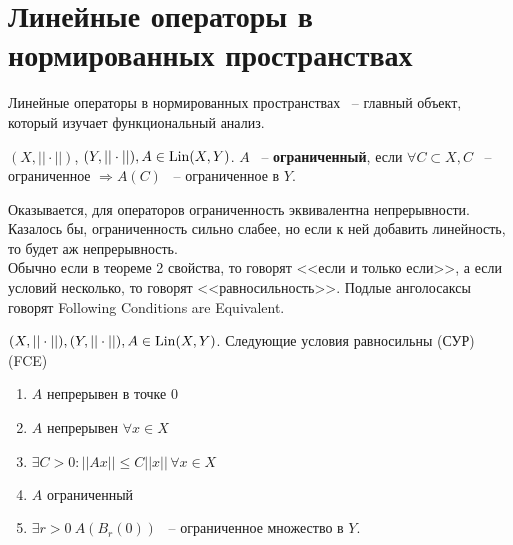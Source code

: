 \documentclass[document]{subfiles}
\begin{document}
\section{Линейные операторы в нормированных пространствах}
Линейные операторы в нормированных пространствах ~-- главный объект, который изучает функциональный анализ.
\begin{definition}
    $(X, || \cdot||)$, $(Y, || \cdot ||), A \in \operatorname{Lin}(X,Y) $. $A$ ~-- \textbf{ ограниченный}, если $\forall C \subset X, C$ ~-- ограниченное $\Rightarrow A(C)$ ~-- ограниченное 
    в $Y$.
\end{definition}
Оказывается, для операторов ограниченность эквивалентна непрерывности. Казалось бы, ограниченность сильно слабее, но если к ней добавить  линейность, то будет аж непрерывность. \\
Обычно если в теореме 2 свойства, то говорят <<если и только если>>, а если условий несколько, то говорят <<равносильность>>. Подлые анголосаксы говорят Following Conditions are Equivalent.

\begin{theorem}
    $(X, ||\cdot||), (Y, ||\cdot||), A \in \operatorname{Lin}(X,Y)$. Следующие условия равносильны (СУР) (FCE)
    \begin{enumerate}
        \item $A$ непрерывен в точке $0$ 
        \item $A$ непрерывен $\forall x \in X$  %
        \item $\exists C > 0 : ||Ax|| \leq C||x|| \, \forall x \in X $
        \item $A$ ограниченный
        \item $\exists r > 0 \: A(B_r(0))$ ~-- ограниченное множество в $Y$.
    \end{enumerate}
\end{theorem}
\end{document}
